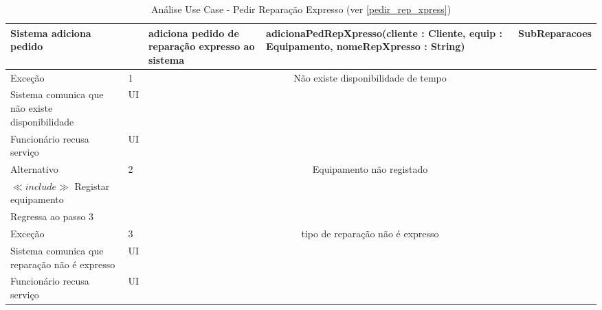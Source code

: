 \documentclass[../relatorio.tex]{subfiles}
\begin{document}
\begin{landscape}
\begin{table}[!h]
\begin{tabular}{|p{5cm}|p{1cm}|p{4cm}|p{6cm}|p{3cm}|}
            \\
            \hline
            Sistema adiciona pedido
                     & 
                     & adiciona pedido de reparação expresso ao sistema
                     & adicionaPedRepXpresso(cliente : Cliente, equip : Equipamento, nomeRepXpresso : String)
                     & SubReparacoes
            \\
            \hline
            \rowcolor{red!30}
            Exceção  & 1                                               &  \multicolumn{3}{c}{Não existe disponibilidade de tempo}\\
            \hline
            \rowcolor{yellow}
            Sistema comunica que não existe disponibilidade
                     & UI
                     & 
                     & 
                     & 
            \\
            \hline
            Funcionário recusa serviço
                     & UI
                     & 
                     & 
                     & 
            \\
            \hline
            \rowcolor{green!30}
            Alternativo  & 2                                               &  \multicolumn{3}{c}{Equipamento não registado}\\
            \hline
            $\ll include \gg$ Registar equipamento
                     & 
                     & 
                     & 
                     & 
            \\
            \hline
            Regressa ao passo 3
                     & 
                     & 
                     & 
                     & 
            \\
            \hline
            \rowcolor{red!30}
            Exceção  & 3                                               &  \multicolumn{3}{c}{tipo de reparação não é expresso}\\
            \hline
            \rowcolor{yellow}
            Sistema comunica que reparação não é expresso
                     & UI
                     & 
                     & 
                     & 
            \\
            \hline
            Funcionário recusa serviço
                     & UI
                     & 
                     & 
                     & 
            \\
            \hline
        \end{tabular}
        \caption{Análise Use Case - Pedir Reparação Expresso (ver \ref{pedir_rep_xpress})}
    \end{table}
\end{landscape}
\end{document}
